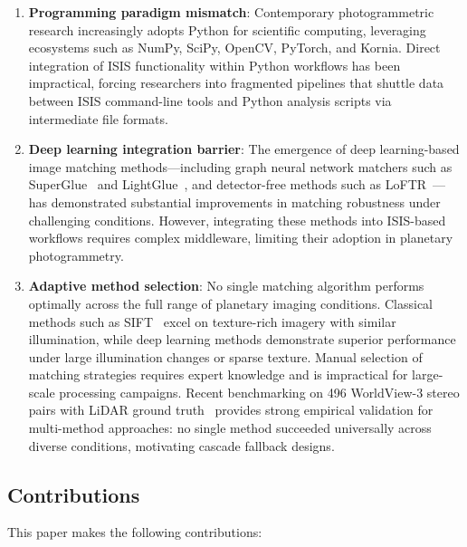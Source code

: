 \documentclass[lettersize,journal]{IEEEtran}
\begin{document}
\begin{enumerate}
    \item \textbf{Programming paradigm mismatch}: Contemporary photogrammetric research increasingly adopts Python for scientific computing, leveraging ecosystems such as NumPy, SciPy, OpenCV, PyTorch, and Kornia. Direct integration of ISIS functionality within Python workflows has been impractical, forcing researchers into fragmented pipelines that shuttle data between ISIS command-line tools and Python analysis scripts via intermediate file formats.

    \item \textbf{Deep learning integration barrier}: The emergence of deep learning-based image matching methods---including graph neural network matchers such as SuperGlue~\cite{sarlin2020superglue} and LightGlue~\cite{lindenberger2023lightglue}, and detector-free methods such as LoFTR~\cite{sun2021loftr}---has demonstrated substantial improvements in matching robustness under challenging conditions. However, integrating these methods into ISIS-based workflows requires complex middleware, limiting their adoption in planetary photogrammetry.

    \item \textbf{Adaptive method selection}: No single matching algorithm performs optimally across the full range of planetary imaging conditions. Classical methods such as SIFT~\cite{lowe2004sift} excel on texture-rich imagery with similar illumination, while deep learning methods demonstrate superior performance under large illumination changes or sparse texture. Manual selection of matching strategies requires expert knowledge and is impractical for large-scale processing campaigns. Recent benchmarking on 496 WorldView-3 stereo pairs with LiDAR ground truth~\cite{satellite2024benchmark} provides strong empirical validation for multi-method approaches: no single method succeeded universally across diverse conditions, motivating cascade fallback designs.
\end{enumerate}

\subsection{Contributions}

This paper makes the following contributions:
\end{document}
